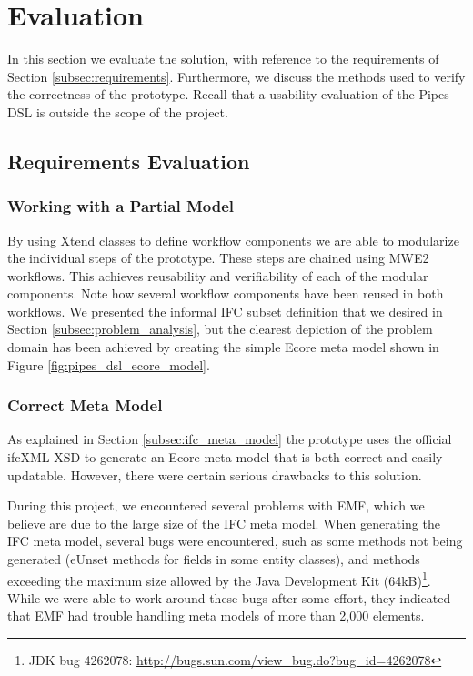 \section{Evaluation}
\label{sec:evaluation}
In this section we evaluate the solution, with reference to the requirements of Section \ref{subsec:requirements}. Furthermore, we discuss the methods used to verify the correctness of the prototype. Recall that a usability evaluation of the Pipes DSL is outside the scope of the project.


\subsection{Requirements Evaluation}
\label{subsec:requirements_evaluation}
\subsubsection{Working with a Partial Model} By using Xtend classes to define workflow components we are able to modularize the individual steps of the prototype. These steps are chained using MWE2 workflows. This achieves reusability and verifiability of each of the modular components. Note how several workflow components have been reused in both workflows. We presented the informal IFC subset definition that we desired in Section \ref{subsec:problem_analysis}, but the clearest depiction of the problem domain has been achieved by creating the simple Ecore meta model shown in Figure \ref{fig:pipes_dsl_ecore_model}.

\subsubsection{Correct Meta Model} As explained in Section \ref{subsec:ifc_meta_model} the prototype uses the official ifcXML XSD to generate an Ecore meta model that is both correct and easily updatable. However, there were certain serious drawbacks to this solution.

During this project, we encountered several problems with EMF, which we believe are due to the large size of the IFC meta model. When generating the IFC meta model, several bugs were encountered, such as some methods not being generated (eUnset methods for fields in some entity classes), and methods exceeding the maximum size allowed by the Java Development Kit (64kB)\footnote{JDK bug 4262078: \url{http://bugs.sun.com/view_bug.do?bug_id=4262078}}. While we were able to work around these bugs after some effort, they indicated that EMF had trouble handling meta models of more than 2,000 elements.

